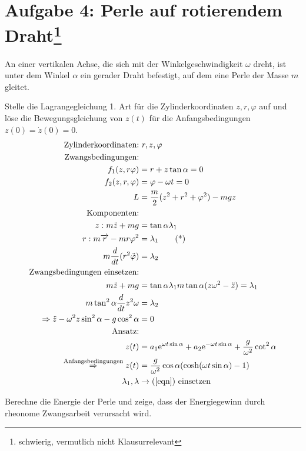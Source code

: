 \section*{Aufgabe 4: Perle auf rotierendem Draht\footnote{schwierig, vermutlich nicht Klausurrelevant}}
An einer vertikalen Achse, die sich mit der Winkelgeschwindigkeit $\omega$ dreht, ist unter dem Winkel $\alpha$ ein gerader Draht befestigt, auf dem eine Perle der Masse $m$ gleitet.
\begin{enumeralph}
	\item Stelle die Lagrangegleichung 1.  Art für die Zylinderkoordinaten $z,r,\varphi$ auf und löse die Bewegungsgleichung von $z(t)$ für die Anfangsbedingungen $z(0) =   \dot{z}(0) = 0$.
	\begin{subequations}
	\begin{align*}
	\text{Zylinderkoordinaten:}&\ r, z, \varphi\\
	\text{Zwangsbedingungen:}\\
	f_1(z,r\varphi)&=r+z\tan\alpha=0\\
	f_2(z,r,\varphi)&=\varphi-\omega t=0\\
	L&=\frac{m}{2}(z^2+r^2+\varphi^2)-mgz\\
	\text{Komponenten:}\\
	z: m\ddot{z}+mg&=\tan\alpha\lambda_1\\
	r: m\overrightarrow{r} - mr\varphi^2&=\lambda_1\tag{*} \label{eqn}\\
	m\frac{d}{dt}(r^2\ddot{\varphi})&=\lambda_2\\
	\text{Zwangsbedingungen einsetzen:}\\
	m\ddot{z}+mg&=\tan\alpha\lambda_1m\tan\alpha(z\omega^2-\ddot{z})=\lambda_1\\
	m\tan^2\alpha\frac{d}{dt}z^2\omega&=\lambda_2\\
	\Rightarrow \ddot{z}-\omega^2z\sin^2\alpha-g\cos^2\alpha&=0\\
	\text{Ansatz:}\\
	z(t)&=a_1\mathrm{e}^{\omega t\sin\alpha}+a_2\mathrm{e}^{-\omega t\sin\alpha}+\frac{g}{\omega^2}\cot^2\alpha\\
	\overset{\text{Anfangsbedingungen}}{\Rightarrow}z(t)&=\frac{g}{\omega^2}\cos\alpha(\cosh(\omega t\sin\alpha)-1)\\
	\lambda_1, \lambda &\rightarrow  \text{(\ref{eqn}) einsetzen}
	\end{align*}
\end{subequations}
	\item Berechne  die  Energie  der  Perle  und  zeige,  dass  der  Energiegewinn  durch  rheonome Zwangsarbeit verursacht wird.

\end{enumeralph}
